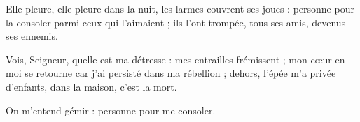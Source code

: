 Elle pleure, elle pleure dans la nuit, les larmes couvrent ses joues : personne pour la consoler parmi ceux qui l’aimaient ; ils l’ont trompée, tous ses amis, devenus ses ennemis.

Vois, Seigneur, quelle est ma détresse : mes entrailles frémissent ; mon cœur en moi se retourne car j’ai persisté dans ma rébellion ; dehors, l’épée m’a privée d’enfants, dans la maison, c’est la mort.

On m’entend gémir : personne pour me consoler.